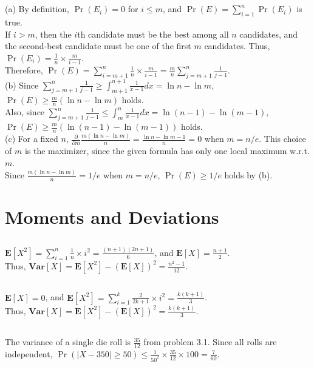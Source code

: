\documentclass{article}
\begin{document}
\subsection{}
(a) By definition, $\Pr(E_i)=0$ for $i \leq m$, and $\Pr(E)=\sum\limits_{i=1}^n\Pr(E_i)$ is true.\\
If $i>m$, then the $i$th candidate must be the best among all $n$ candidates, and the second-best candidate must be one of the first $m$ candidates.
Thus, $\Pr(E_i)=\frac{1}{n}\times\frac{m}{i-1}$.\\
Therefore, $\Pr(E)=\sum\limits_{i=m+1}^n\frac{1}{n}\times\frac{m}{i-1}=\frac{m}{n}\sum\limits_{j=m+1}^n\frac{1}{j-1}$.\\
(b) Since $\sum\limits_{j=m+1}^n\frac{1}{j-1} \geq \int_{m+1}^{n+1}\frac{1}{x-1}dx=\ln n-\ln m$, $\Pr(E) \geq \frac{m}{n}(\ln n-\ln m)$ holds.\\
Also, since $\sum\limits_{j=m+1}^n\frac{1}{j-1} \leq \int_{m}^{n}\frac{1}{x-1}dx=\ln (n-1)-\ln (m-1)$, $\Pr(E) \geq \frac{m}{n}(\ln (n-1)-\ln (m-1))$ holds.\\
(c) For a fixed $n$, $\frac{\partial}{\partial m} \frac{m(\ln n - \ln m)}{n} = \frac{\ln n - \ln m - 1}{n} = 0$ when $m=n/e$.
This choice of $m$ is the maximizer, since the given formula has only one local maximum w.r.t. $m$.\\
Since $\frac{m(\ln n - \ln m)}{n}=1/e$ when $m=n/e$, $\Pr(E) \geq 1/e$ holds by (b).
\newpage
\section{Moments and Deviations}
\subsection{}
$\textbf{E}[X^2]=\sum\limits_{i=1}^n\frac{1}{n}\times i^2 = \frac{(n+1)(2n+1)}{6}$, and $\textbf{E}[X]=\frac{n+1}{2}$.\\
Thus, $\textbf{Var}[X]=\textbf{E}[X^2]-(\textbf{E}[X])^2=\frac{n^2-1}{12}$.
\subsection{}
$\textbf{E}[X]=0$, and $\textbf{E}[X^2]=\sum\limits_{i=1}^k \frac{2}{2k+1} \times i^2 = \frac{k(k+1)}{3}$.\\
Thus, $\textbf{Var}[X]=\textbf{E}[X^2]-(\textbf{E}[X])^2=\frac{k(k+1)}{3}$.
\subsection{}
The variance of a single die roll is $\frac{35}{12}$ from problem 3.1.
Since all rolls are independent, $\Pr(|X-350| \geq 50) \leq \frac{1}{50^2}\times \frac{35}{12} \times 100 = \frac{7}{60}$.
\end{document}
